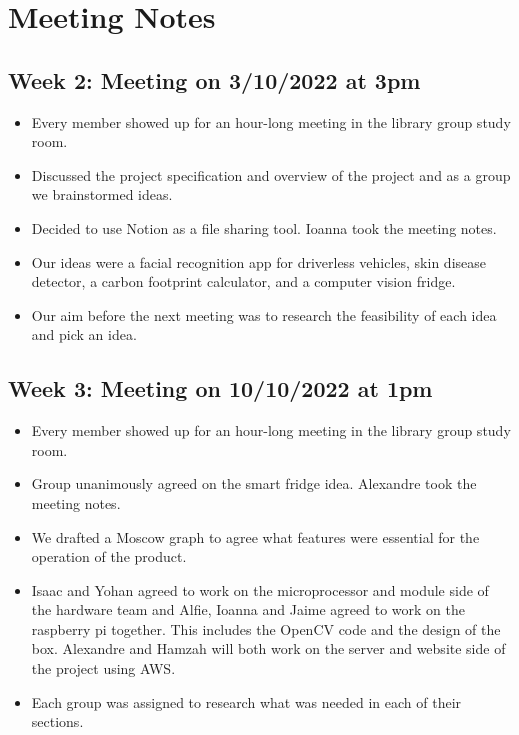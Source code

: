 \section{Meeting Notes}
\subsection*{Week 2: Meeting on 3/10/2022 at 3pm}
\begin{itemize}
    \item Every member showed up for an hour-long meeting in the library group study room. 
    \item Discussed the project specification and overview of the project and as a group we brainstormed ideas. 
    \item Decided to use Notion as a file sharing tool. Ioanna took the meeting notes. 
    \item Our ideas were a facial recognition app for driverless vehicles, skin disease detector, a carbon footprint calculator, and a computer vision fridge. 
    \item Our aim before the next meeting was to research the feasibility of each idea and pick an idea. 
\end{itemize}

\subsection*{Week 3: Meeting on 10/10/2022 at 1pm }
\begin{itemize}
    \item   Every member showed up for an hour-long meeting in the library group study room. 
    \item   Group unanimously agreed on the smart fridge idea. Alexandre took the meeting notes. 
    \item   We drafted a Moscow graph to agree what features were essential for the operation of the product. 
    \item   Isaac and Yohan agreed to work on the microprocessor and module side of the hardware team and Alfie, Ioanna and Jaime agreed to work on the raspberry pi together. This includes the OpenCV code and the design of the box. Alexandre and Hamzah will both work on the server and website side of the project using AWS. 
    \item   Each group was assigned to research what was needed in each of their sections.  
\end{itemize}

